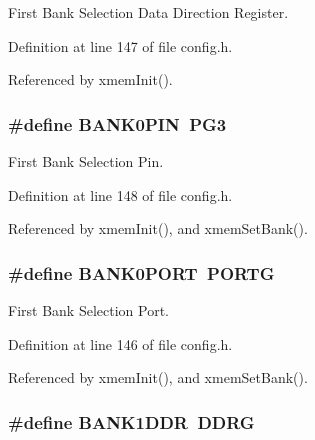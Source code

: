 First Bank Selection Data Direction Register. 



Definition at line 147 of file config.\-h.



Referenced by xmem\-Init().

\hypertarget{group__config_gaa176e9b2752f764cd7e7d9fd49d46af8}{
\subsubsection[{B\-A\-N\-K0\-P\-I\-N}]{\setlength{\rightskip}{0pt plus 5cm}\#define B\-A\-N\-K0\-P\-I\-N~P\-G3}}\label{group__config_gaa176e9b2752f764cd7e7d9fd49d46af8}


First Bank Selection Pin. 



Definition at line 148 of file config.\-h.



Referenced by xmem\-Init(), and xmem\-Set\-Bank().

\hypertarget{group__config_gabeec1986c81588dde8863b7936028fc9}{
\subsubsection[{B\-A\-N\-K0\-P\-O\-R\-T}]{\setlength{\rightskip}{0pt plus 5cm}\#define B\-A\-N\-K0\-P\-O\-R\-T~P\-O\-R\-T\-G}}\label{group__config_gabeec1986c81588dde8863b7936028fc9}


First Bank Selection Port. 



Definition at line 146 of file config.\-h.



Referenced by xmem\-Init(), and xmem\-Set\-Bank().

\hypertarget{group__config_gada13cb9312072b48628763a6e1fd50d3}{
\subsubsection[{B\-A\-N\-K1\-D\-D\-R}]{\setlength{\rightskip}{0pt plus 5cm}\#define B\-A\-N\-K1\-D\-D\-R~D\-D\-R\-G}}\label{group__config_gada13cb9312072b48628763a6e1fd50d3}


